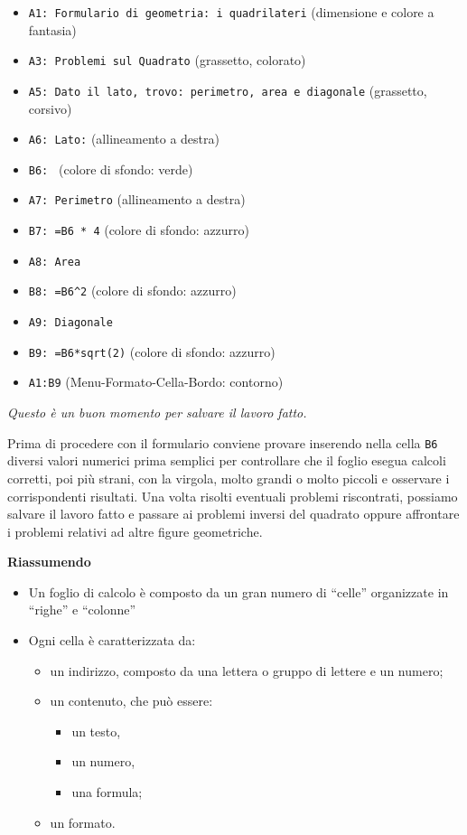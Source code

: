 \begin{itemize} [noitemsep]
\item \texttt{A1: Formulario di geometria: i quadrilateri}
(dimensione e colore a fantasia)
\item \texttt{A3: Problemi sul Quadrato} 
(grassetto, colorato)
\item \texttt{A5: Dato il lato, trovo: perimetro, area e diagonale}
(grassetto, corsivo)
\item \texttt{A6: Lato:}
(allineamento a destra)
\item \texttt{B6: }
(colore di sfondo: verde)
\item \texttt{A7: Perimetro}
(allineamento a destra)
\item \texttt{B7: =B6 * 4}
(colore di sfondo: azzurro)
\item \texttt{A8: Area}
\item \texttt{B8: =B6\textasciicircum{}2}
(colore di sfondo: azzurro)
\item \texttt{A9: Diagonale}
\item \texttt{B9: =B6*sqrt(2)}
(colore di sfondo: azzurro)
\item \texttt{A1:B9}
(Menu-Formato-Cella-Bordo: contorno)
\end{itemize}

\emph{Questo è un buon momento per salvare il lavoro fatto.}

Prima di procedere con il formulario conviene provare inserendo nella cella
\texttt{B6} diversi valori numerici prima semplici per controllare che il foglio
esegua calcoli corretti, poi più strani, con la virgola, molto grandi o
molto piccoli e osservare i corrispondenti risultati.
Una volta risolti eventuali problemi riscontrati, possiamo salvare il lavoro
fatto e passare ai problemi inversi del quadrato oppure
affrontare i problemi relativi ad altre figure geometriche.

\textbf{Riassumendo}

\begin{itemize} [noitemsep]
\item 
Un foglio di calcolo è composto da un gran numero di ``celle'' organizzate
in ``righe'' e ``colonne''
\item 
Ogni cella è caratterizzata da:
\begin{itemize} [noitemsep]
\item 
un indirizzo, composto da una lettera o gruppo di lettere e un numero;
\item 
un contenuto, che può essere:
\begin{itemize}
\item 
un testo,
\item 
un numero,
\item 
una formula;
\end{itemize}
\item 
un formato.
\end{itemize}
\end{itemize}

